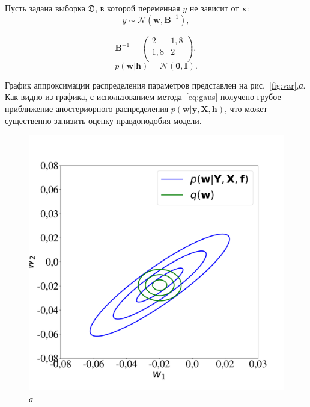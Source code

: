 \begin{example}
Пусть  задана выборка $\mathfrak{D}$, в которой переменная ${y}$ не зависит от $\mathbf{x}$:
\begin{equation}
\label{eq:example_post}
	{y} \sim \mathcal{N}(\mathbf{w}, \mathbf{B}^{-1}),
\end{equation}

\[
	\mathbf{B}^{-1} = \left( \begin{array}{cc}
	2 & 1,8 \\
	1,8 & 2\\
	\end{array}  \right),
\]
\[
	p(\mathbf{w}|\mathbf{h}) = \mathcal{N}(\mathbf{0}, \mathbf{I}).
\]

График аппроксимации распределения параметров представлен на рис.~\ref{fig:var},\textit{а}. Как видно из графика, с использованием метода~\eqref{eq:gaus} получено грубое приближение апостериорного распределения $p(\mathbf{w}|\mathbf{y}, \mathbf{X}, \mathbf{h})$, что может существенно занизить оценку правдоподобия модели.


\begin{figure}[tbh!]



 \caption*{\textit{а}}
  \includegraphics[width=\linewidth]{./plots/var/mf.pdf}


\end{figure}
\end{example}
